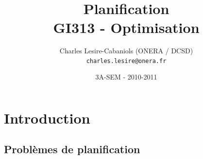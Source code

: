 \documentclass[compress]{beamer}
\title[SEM GI313 - Planification]{{\Large Planification}\\GI313 - Optimisation}
\author[Charles Lesire]{Charles Lesire-Cabaniols (ONERA / DCSD)\\{\tt charles.lesire@onera.fr}}
\date[2010-2011]{3A-SEM - 2010-2011}
\begin{document}
\begin{frame}
\titlepage
\end{frame}

\begin{frame}
\tableofcontents[hidesubsections]
\end{frame}

\section{Introduction}
\begin{frame}
\tableofcontents[hideothersubsections]
\end{frame}

\subsection{Problèmes de planification}
\end{document}
